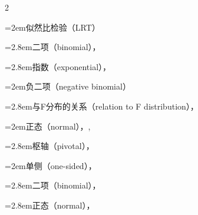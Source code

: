 \begin{multicols}{2}
\par\noindent\hangindent=2em\hspace*{1em}\label{idx:158}似然比检验（LRT）\par
\par\noindent\hangindent=2.8em\hspace*{1.8em}\label{idx:159}二项（binomial），\hyperref[exercise:9.6]{\pageref*{exercise:9.6}}\par
\par\noindent\hangindent=2.8em\hspace*{1.8em}\label{idx:160}指数（exponential），\hyperref[ex:9.2.3]{\pageref*{ex:9.2.3}}\par
{}
\par\noindent\hangindent=2em\hspace*{1em}\label{idx:161}负二项（negative binomial）\par
\par\noindent\hangindent=2.8em\hspace*{1.8em}\label{idx:162}与F分布的关系（relation to F distribution），\hyperref[exercise:9.22]{\pageref*{exercise:9.22}}\par
\par\noindent\hangindent=2em\hspace*{1em}\label{idx:163}正态（normal），\hyperref[ex:9.1.2]{\pageref*{ex:9.1.2}}, \hyperref[ex:9.2.1]{\pageref*{ex:9.2.1}}\par
\par\noindent\hangindent=2.8em\hspace*{1.8em}\label{idx:164}枢轴（pivotal），\hyperref[ex:9.2.10]{\pageref*{ex:9.2.10}}\par
\par\noindent\hangindent=2em\hspace*{1em}\label{idx:165}单侧（one-sided），\hyperref[idxocc:165:368]{\pageref*{idxocc:165:368}}\par
\par\noindent\hangindent=2.8em\hspace*{1.8em}\label{idx:166}二项（binomial），\hyperref[ex:9.2.5]{\pageref*{ex:9.2.5}}\par
\par\noindent\hangindent=2.8em\hspace*{1.8em}\label{idx:167}正态（normal），\hyperref[ex:9.2.4]{\pageref*{ex:9.2.4}}\par

\end{multicols}
